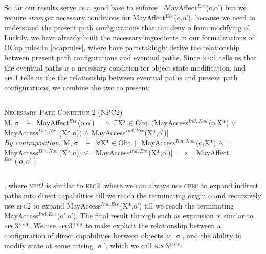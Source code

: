\documentclass[a4paper,11pt, twoside,twocolumn]{article}
\newenvironment{logic}[1][]
{\begin{flushleft} \small }
{\end{flushleft}}
\newcommand{\loin}{$\in$}
\newcommand{\loforall}{$\forall$}
\newcommand{\loexists}{$\exists$}
\newcommand{\loand}{$\land$}
\newcommand{\loor} {$\lor$}
\newcommand{\loimplies}{$\implies$}
\newcommand{\losigma}{$\upsigma$}
\newcommand{\loturns} {$\vDash$}
\newcommand{\loneg}{$\boldsymbol \neg$}
\newcommand{\ablock} {\null\qquad}
\begin{document}
So far our results serve as a good base to enforce \loneg MayAffect$^{Eve}$(o,o') but we require \textit{stronger} necessary conditions for MayAffect$^{Eve}$(o,o'), because we need to understand the present path configurations that can deny o from modifying o'. Luckily, we have already built the necessary ingredients in our formalizations of OCap rules in \ref{ocaprules}, where have painstakingly derive the relationship between present path configurations and eventual paths. Since \textsc{npc1} tells us that the eventual paths is a necessary condition for object state modification, and \textsc{epc1} tells us the the relationship between eventual paths and present path configurations, we combine the two to present: 

\begin{logic}
\hrule\null
\textsc{\normalsize *Necessary Path Condition 2 (NPC2)}\\
M,\losigma\ \loturns\ MayAffect$^{Eve}$(o,o')\linebreak
\ablock \loimplies\linebreak
\ablock \loexists X*\loin Obj.$[($MayAccess$^{Ind,Now}$(o,X*) \loor \linebreak
\ablock \ablock \ablock \quad MayAccess$^{Dir,Now}$(X*,o)$)$\linebreak
\ablock \ablock \ablock \ablock \loand \linebreak
\ablock \ablock \ablock \quad MayAccess$^{Ind,Eve}$(X*,o')$]$
\linebreak \\
\textit{By contraposition,}\linebreak
M,\losigma\ \loturns\ 
\loforall X*\loin Obj. $[$\loneg MayAccess$^{Ind,Now}$(o,X*) \loand \linebreak
\ablock \ablock \ablock \ablock \loneg MayAccess$^{Dir,Now}$(X*,o)$]$\linebreak
\ablock \ablock \ablock \ablock \loor \linebreak
\ablock \ablock \ablock \ablock \loneg MayAccess$^{Ind,Eve}$(X*,o')$]$\linebreak
\ablock \loimplies \linebreak
	\ablock\loneg MayAffect$^{Eve}(o,o')$\linebreak
\hrule
\end{logic}
, where \textsc{npc2} is similar to \textsc{epc2}, where we can always use \textsc{gpec} to expand indirect paths into direct capabilities till we reach the terminating origin o and recursively use \textsc{epc2} to expand MayAccess$^{Ind,Eve}$(X*,o') till we reach the terminating MayAccess$^{Ind,Eve}$(o',o'). The final result through such as expansion is similar to \textsc{epc3***}. We use \textsc{epc3***} to make explicit the relationship between a configuration of direct capabilities between objects at \losigma, and the ability to modify state at some arising \losigma', which we call \textsc{ncc3***}:
\end{document}
